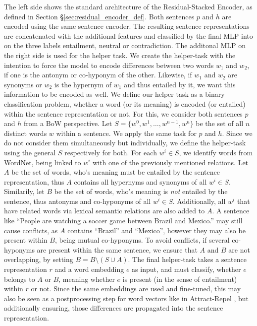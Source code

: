 The left side shows the standard architecture of the Residual-Stacked Encoder, as defined in Section §\ref{sec:residual_encoder_def}. Both sentences $p$ and $h$ are encoded using the same sentence encoder. The resulting sentence representations are concatenated with the additional features and classified by the final \ac{MLP} into on the three labels entailment, neutral or contradiction. The additonal \ac{MLP} on the right side is used for the helper task. We create the helper-task with the intention to force the model to encode differences between two words $w_1$ and $w_2$, if one is the antonym or co-hyponym of the other.  Likewise, if $w_1$ and $w_2$ are synonyms or $w_2$ is the hypernym of $w_1$ and thus entailed by it, we want this information to be encoded as well. We define our helper task as a binary classification problem, whether a word (or its meaning) is encoded (or entailed) within the sentence representation or not. For this, we consider both sentences $p$ and $h$ from a \ac{BoW} perspective. Let $S=\{w^0, w^1 , \ldots, w^{n-1}, w^n\}$ be the set of all $n$ distinct words $w$ within a sentence. We apply the same task for $p$ and $h$. Since we do not consider them simultaneously but individually, we define the helper-task using the general $S$ respectively for both. For each $w^i \in S$, we identify words from WordNet, being linked to $w^i$ with one of the previously mentioned relations. Let $A$ be the set of words, who's meaning must be entailed by the sentence representation, thus $A$ contains all hypernyms and synonyms of all $w^i \in S$. Similarily, let $B$ be the set of words, who's meaning is \textit{not} entailed by the sentence, thus antonyms and co-hyponyms of all $w^i \in S$. Additionally, all $w^i$ that have related words via lexical semantic relations are also added to $A$. A sentence like ``People are watching a soccer game between Brazil and Mexico.'' may still cause conflicts, as $A$ contains ``Brazil'' and ``Mexico'', however they may also be present within $B$, being mutual co-hyponyms. To avoid conflicts, if several co-hyponyms are present within the same sentence, we ensure that $A$ and $B$ are not overlapping, by setting $B = B \setminus (S \cup A)$. The final helper-task takes a sentence representation $r$ and a word embedding $e$ as input, and must classify, whether $e$ belongs to $A$ or $B$, meaning whether $e$ is present (in the sense of entailment) within $r$ or not. Since the same embeddings are used and fine-tuned, this may also be seen as a postprocessing step for word vectors like in Attract-Repel \citep{vulic2017specialising}, but additionally ensuring, those differences are propagated into the sentence representation. 

